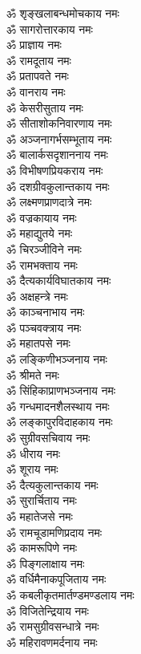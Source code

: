 \begin{multicols}{2}
\begin{flushleft}
ॐ शृङ्खलाबन्धमोचकाय नमः\\
ॐ सागरोत्तारकाय नमः\\
ॐ प्राज्ञाय नमः\hfill{}\\
ॐ रामदूताय नमः\\
ॐ प्रतापवते नमः\\
ॐ वानराय नमः\\
ॐ केसरीसुताय नमः\\
ॐ सीताशोकनिवारणाय नमः\\
ॐ अञ्जनागर्भसम्भूताय नमः\\
ॐ बालार्कसदृशाननाय नमः\\
ॐ विभीषणप्रियकराय नमः\\
ॐ दशग्रीवकुलान्तकाय नमः\\
ॐ लक्ष्मणप्राणदात्रे नमः\hfill{}\\
ॐ वज्रकायाय नमः\\
ॐ महाद्युतये नमः\\
ॐ चिरञ्जीविने नमः\\
ॐ रामभक्ताय नमः\\
ॐ दैत्यकार्यविघातकाय नमः\\
ॐ अक्षहन्त्रे नमः\\
ॐ काञ्चनाभाय नमः\\
ॐ पञ्चवक्त्राय नमः\\
ॐ महातपसे नमः\\
ॐ लङ्किणीभञ्जनाय नमः\hfill{}\\
ॐ श्रीमते नमः\\
ॐ सिंहिकाप्राणभञ्जनाय नमः\\
ॐ गन्धमादनशैलस्थाय नमः\\
ॐ लङ्कापुरविदाहकाय नमः\\
ॐ सुग्रीवसचिवाय नमः\\
ॐ धीराय नमः\\
ॐ शूराय नमः\\
ॐ दैत्यकुलान्तकाय नमः\\
ॐ सुरार्चिताय नमः\\
ॐ महातेजसे नमः\hfill{}\\
ॐ रामचूडामणिप्रदाय नमः\\
ॐ कामरूपिणे नमः\\
ॐ पिङ्गलाक्षाय नमः\\
ॐ वर्धिमैनाकपूजिताय नमः\\
ॐ कबलीकृत\-मार्तण्डमण्डलाय नमः\\
ॐ विजितेन्द्रियाय नमः\\
ॐ रामसुग्रीवसन्धात्रे नमः\\
ॐ महिरावणमर्दनाय नमः\\

\end{flushleft}
\end{multicols}
